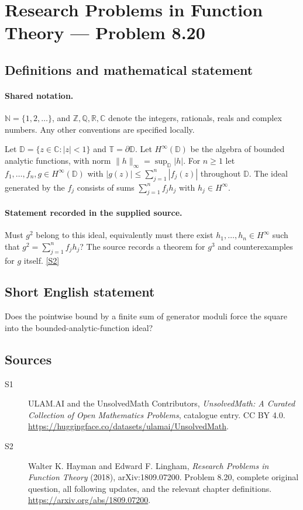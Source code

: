\documentclass[11pt]{book}
\newcommand{\sref}[2]{\hyperlink{source:#1:#2}{[S#2]}}
\begin{document}
\section{Research Problems in Function Theory — Problem 8.20}\label{statement}

\subsection{Definitions and mathematical statement}

\paragraph{Shared notation.}$\mathbb N=\{1,2,\ldots\}$, and $\mathbb Z,\mathbb Q,\mathbb R,\mathbb C$ denote the integers, rationals, reals and complex numbers. Any other conventions are specified locally.


Let $\mathbb D=\{z\in\mathbb C:|z|<1\}$ and $\mathbb T=\partial\mathbb D$. Let $H^{\infty}(\mathbb D)$ be the algebra of bounded analytic functions, with norm $\|h\|_\infty=\sup_{\mathbb D}|h|$. For $n\ge1$ let $f_1,\ldots,f_n,g\in H^{\infty}(\mathbb D)$ with $|g(z)|\le\sum_{j=1}^n|f_j(z)|$ throughout $\mathbb D$. The ideal generated by the $f_j$ consists of sums $\sum_{j=1}^nf_jh_j$ with $h_j\in H^{\infty}$.
\paragraph{Statement recorded in the supplied source.}
Must $g^2$ belong to this ideal, equivalently must there exist $h_1,\ldots,h_n\in H^{\infty}$ such that $g^2=\sum_{j=1}^nf_jh_j$? The source records a theorem for $g^3$ and counterexamples for $g$ itself. \sref{statement}{2}
\subsection{Short English statement}
Does the pointwise bound by a finite sum of generator moduli force the square into the bounded-analytic-function ideal?
\subsection{Sources}
\begin{description}
\item[\hypertarget{source:statement:1}{S1}] ULAM.AI and the UnsolvedMath Contributors, \emph{UnsolvedMath: A Curated Collection of Open Mathematics Problems}, catalogue entry. CC BY 4.0. \url{https://huggingface.co/datasets/ulamai/UnsolvedMath}.
\item[\hypertarget{source:statement:2}{S2}] Walter K. Hayman and Edward F. Lingham, \emph{Research Problems in Function Theory} (2018), arXiv:1809.07200. Problem 8.20, complete original question, all following updates, and the relevant chapter definitions. \url{https://arxiv.org/abs/1809.07200}.
\end{description}
\label{end:statement}
\end{document}
